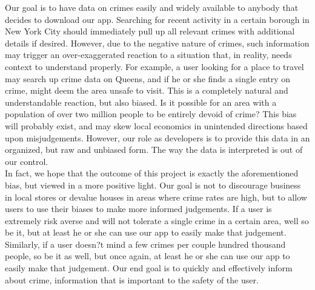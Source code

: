 \documentclass[paper=a4, fontsize=11pt]{scrartcl} %
\numberwithin{equation}{section} %
\numberwithin{figure}{section} %
\numberwithin{table}{section} %
\begin{document}
Our goal is to have data on crimes easily and widely available to anybody that decides to download our app. Searching for recent activity in a certain borough in New York City should immediately pull up all relevant crimes with additional details if desired. However, due to the negative nature of crimes, such information may trigger an over-exaggerated reaction to a situation that, in reality, needs context to understand properly. For example, a user looking for a place to travel may search up crime data on Queens, and if he or she finds a single entry on crime, might deem the area unsafe to visit. This is a completely natural and understandable reaction, but also biased. Is it possible for an area with a population of over two million people to be entirely devoid of crime? This bias will probably exist, and may skew local economics in unintended directions based upon misjudgements. However, our role as developers is to provide this data in an organized, but raw and unbiased form. The way the data is interpreted is out of our control. \\

In fact, we hope that the outcome of this project is exactly the aforementioned bias, but viewed in a more positive light. Our goal is not to discourage business in local stores or devalue houses in areas where crime rates are high, but to allow users to use their biases to make more informed judgements. If a user is extremely risk averse and will not tolerate a single crime in a certain area, well so be it, but at least he or she can use our app to easily make that judgement. Similarly, if a user doesn?t mind a few crimes per couple hundred thousand people, so be it as well, but once again, at least he or she can use our app to easily make that judgement. Our end goal is to quickly and effectively inform about crime, information that is important to the safety of the user. \\
\end{document}

